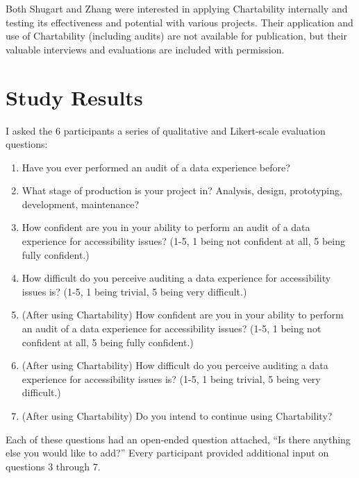 \documentclass{egpubl}
\begin{document}
Both Shugart and Zhang were interested in applying Chartability internally and testing its effectiveness and potential with various projects. Their application and use of Chartability (including audits) are not available for publication, but their valuable interviews and evaluations are included with permission.


\section{Study Results}

I asked the 6 participants a series of qualitative and Likert-scale evaluation questions:

\begin{enumerate}
  \item Have you ever performed an audit of a data experience before?
  \item What stage of production is your project in? Analysis, design, prototyping, development, maintenance?
  \item How confident are you in your ability to perform an audit of a data experience for accessibility issues? (1-5, 1 being not confident at all, 5 being fully confident.)
  \item How difficult do you perceive auditing a data experience for accessibility issues is? (1-5, 1 being trivial, 5 being very difficult.)
  \item (After using Chartability) How confident are you in your ability to perform an audit of a data experience for accessibility issues? (1-5, 1 being not confident at all, 5 being fully confident.)
  \item (After using Chartability) How difficult do you perceive auditing a data experience for accessibility issues is? (1-5, 1 being trivial, 5 being very difficult.)
  \item (After using Chartability) Do you intend to continue using Chartability?
\end{enumerate}

Each of these questions had an open-ended question attached, ``Is there anything else you would like to add?'' Every participant provided additional input on questions 3 through 7. 
\end{document}
